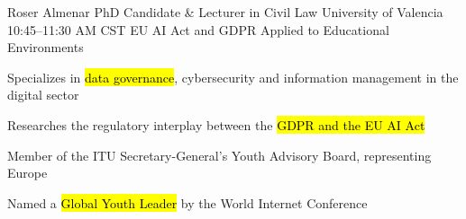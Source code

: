   {Roser Almenar}
  {PhD Candidate \& Lecturer in Civil Law \textperiodcentered{} University of Valencia}
  {10:45--11:30 AM CST}
  {EU AI Act and GDPR Applied to Educational Environments}
  {\item Specializes in \hl{data governance}, cybersecurity and information management in the digital sector
   \item Researches the regulatory interplay between the \hl{GDPR and the EU AI Act}
   \item Member of the ITU Secretary-General's Youth Advisory Board, representing Europe
   \item Named a \hl{Global Youth Leader} by the World Internet Conference}
